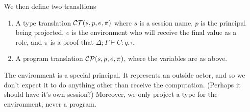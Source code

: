 \documentclass{article}
\theoremstyle{definition}
\newcommand{\proves}{\vdash}
\begin{document}
We then define two transltions
\begin{enumerate}
\item A type translation $\mathcal{C}\mathcal{T}(s, p, e, \pi)$ where $s$ is a session name, $p$ is the principal being projected, $e$ is the environment who will receive the final value as a role, and $\pi$ is a proof that $\Delta; \Gamma \proves C : q.\tau$.
\item A program translation $\mathcal{C}\mathcal{P}(s, p, e, \pi)$, where the variables are as above.
\end{enumerate}

The environment is a special principal.
It represents an outside actor, and so we don't expect it to do anything other than receive the computation.
(Perhaps it should have it's own session?)
Moreover, we only project a type for the environment, never a program.
\end{document}
